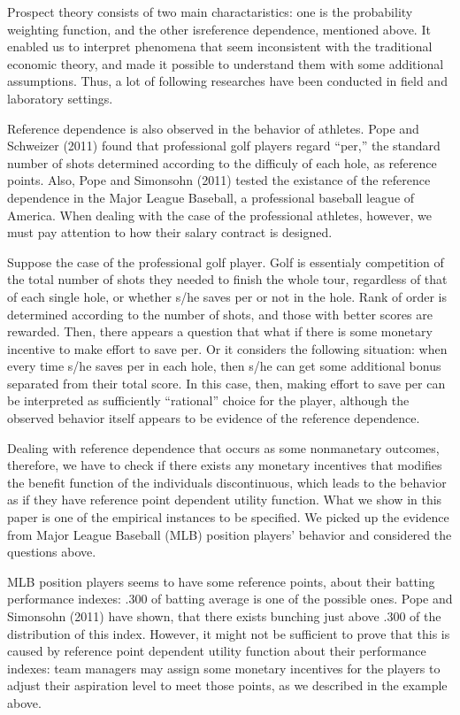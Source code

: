 \documentclass[dvipdfmx, 12pt]{article}
\begin{document}
Prospect theory consists of two main charactaristics: one is the probability weighting function, and the other isreference dependence, mentioned above. It enabled us to interpret phenomena that seem inconsistent with the traditional economic theory, and made it possible to understand them with some additional assumptions. Thus, a lot of following researches have been conducted in field and laboratory settings.

Reference dependence is also observed in the behavior of athletes. Pope and Schweizer (2011) found that professional golf players regard ``per,'' the standard number of shots determined according to the difficuly of each hole, as reference points. Also, Pope and Simonsohn (2011) tested the existance of the reference dependence in the Major League Baseball, a professional baseball league of America. When dealing with the case of the professional athletes, however, we must pay attention to how their salary contract is designed.

Suppose the case of the professional golf player. Golf is essentialy competition of the total number of shots they needed to finish the whole tour, regardless of that of each single hole, or whether s/he saves per or not in the hole. Rank of order is determined according to the number of shots, and those with better scores are rewarded. Then, there appears a question that what if there is some monetary incentive to make effort to save per. Or it considers the following situation: when every time s/he saves per in each hole, then s/he can get some additional bonus separated from their total score. In this case, then, making effort to save per can be interpreted as sufficiently ``rational'' choice for the player, although the observed behavior itself appears to be evidence of the reference dependence.

Dealing with reference dependence that occurs as some nonmanetary outcomes, therefore, we have to check if there exists any monetary incentives that modifies the benefit function of the individuals discontinuous, which leads to the behavior as if they have reference point dependent utility function. What we show in this paper is one of the empirical instances to be specified. We picked up the evidence from Major League Baseball (MLB) position players' behavior and considered the questions above.

MLB position players seems to have some reference points, about their batting performance indexes: .300 of batting average is one of the possible ones. Pope and Simonsohn (2011) have shown, that there exists bunching just above .300 of the distribution of this index. However, it might not be sufficient to prove that this is caused by reference point dependent utility function about their performance indexes: team managers may assign some monetary incentives for the players to adjust their aspiration level to meet those points, as we described in the example above.
\end{document}
